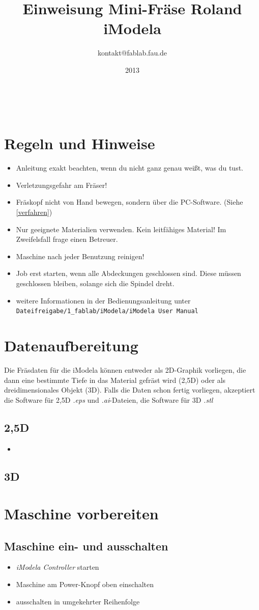 \documentclass{\basedir/fablab-document}
\date{2013}
\author{kontakt@fablab.fau.de}
\title{Einweisung Mini-Fräse Roland iModela}
\begin{document}
~
\section{Regeln und Hinweise}
\begin{itemize}
\item Anleitung exakt beachten, wenn du nicht ganz genau weißt, was du
tust.
\item Verletzungsgefahr am Fräser!
\item Fräskopf nicht von Hand bewegen, sondern über die PC-Software. (Siehe \ref{verfahren})
\item Nur geeignete Materialien verwenden. Kein leitfähiges Material! Im Zweifelsfall frage einen Betreuer.
\item Maschine nach jeder Benutzung reinigen!
\item Job erst starten, wenn alle Abdeckungen geschlossen sind. Diese müssen geschlossen bleiben, solange sich die Spindel dreht.
\item weitere Informationen in der Bedienungsanleitung unter\\ \texttt{Dateifreigabe/1\_fablab/iModela/iModela User Manual}
\end{itemize}
\section{Datenaufbereitung}
Die Fräsdaten für die iModela können entweder als 2D-Graphik vorliegen, die dann eine bestimmte Tiefe in das Material gefräst wird (2,5D) oder als dreidimensionales Objekt (3D). Falls die Daten schon fertig vorliegen, akzeptiert die Software für 2,5D \emph{.eps} und \emph{.ai}-Dateien, die Software für 3D \emph{.stl} 
\subsection{2,5D}
\begin{itemize}
\item {}
\end{itemize}

\subsection{3D}

\section{Maschine vorbereiten}
\subsection{Maschine ein- und ausschalten}
\begin{itemize}
	\item \emph{iModela Controller} starten 
	\item Maschine am Power-Knopf oben einschalten 
	\item ausschalten in umgekehrter Reihenfolge
\end{itemize}
\end{document}
